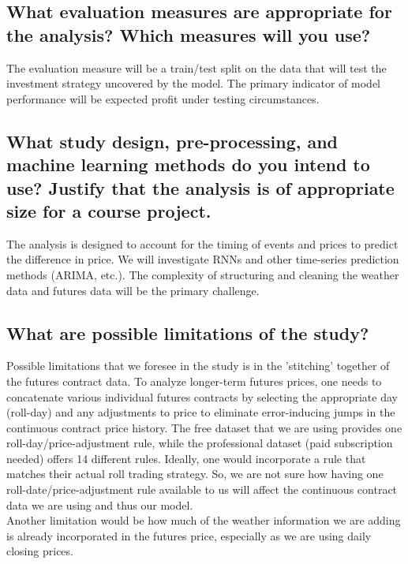 \documentclass[twoside,11pt]{article}
\begin{document}
\subsection{What evaluation measures are appropriate for the analysis? Which measures will you use?}

The evaluation measure will be a train/test split on the data that will test the investment strategy uncovered by the model. The primary indicator of model performance will be expected profit under testing circumstances.

\subsection{What study design, pre-processing, and machine learning methods do you intend to use? Justify that the analysis is of appropriate size for a course project.}

The analysis is designed to account for the timing of events and prices to predict the difference in price. We will investigate RNNs and other time-series prediction methods (ARIMA, etc.). The complexity of structuring and cleaning the weather data and futures data will be the primary challenge.

\subsection{What are possible limitations of the study?}

Possible limitations that we foresee in the study is in the 'stitching' together of the futures contract data.  To analyze longer-term futures prices, one needs to concatenate various individual futures contracts by selecting the appropriate day (roll-day) and any adjustments to price to eliminate error-inducing jumps in the continuous contract price history.  The free dataset that we are using provides one roll-day/price-adjustment rule, while the professional dataset (paid subscription needed) offers 14 different rules.  Ideally, one would incorporate a rule that matches their actual roll trading strategy.  So, we are not sure how having one roll-date/price-adjustment rule available to us will affect the continuous contract data we are using and thus our model.\\
\indent Another limitation would be how much of the weather information we are adding is already incorporated in the futures price, especially as we are using daily closing prices.





\end{document}
